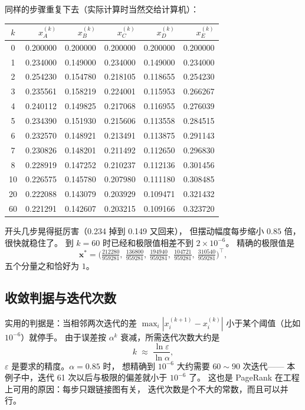\documentclass[UTF8,11pt,fontset=macnew]{ctexart}
\newcommand{\xv}{\mathbf{x}}
\begin{document}
同样的步骤重复下去（实际计算时当然交给计算机）：

\begin{center}
\footnotesize
\setlength{\tabcolsep}{7pt}
\begin{tabular}{c rrrrr}
\toprule
$k$ & $x_A^{(k)}$ & $x_B^{(k)}$ & $x_C^{(k)}$ & $x_D^{(k)}$ & $x_E^{(k)}$\\
\midrule
0  & 0.200000 & 0.200000 & 0.200000 & 0.200000 & 0.200000\\
1  & 0.234000 & 0.149000 & 0.234000 & 0.149000 & 0.234000\\
2  & 0.254230 & 0.154780 & 0.218105 & 0.118655 & 0.254230\\
3  & 0.235561 & 0.158219 & 0.224001 & 0.115953 & 0.266267\\
4  & 0.240112 & 0.149825 & 0.217068 & 0.116955 & 0.276039\\
5  & 0.234390 & 0.151930 & 0.215606 & 0.113558 & 0.284515\\
6  & 0.232570 & 0.148921 & 0.213491 & 0.113875 & 0.291143\\
7  & 0.230826 & 0.148201 & 0.211492 & 0.112650 & 0.296830\\
8  & 0.228919 & 0.147252 & 0.210237 & 0.112136 & 0.301456\\
10 & 0.226575 & 0.145780 & 0.207980 & 0.111180 & 0.308485\\
20 & 0.222088 & 0.143079 & 0.203929 & 0.109471 & 0.321432\\
60 & 0.221291 & 0.142607 & 0.203215 & 0.109166 & 0.323720\\
\bottomrule
\end{tabular}
\end{center}

开头几步晃得挺厉害（0.234 掉到 0.149 又回来），
但摆动幅度每步缩小 $0.85$ 倍，很快就稳住了。
到 $k=60$ 时已经和极限值相差不到 $2\times 10^{-6}$。
精确的极限值是
\[
\xv^*=\Big(\tfrac{212280}{959281},\ \tfrac{136800}{959281},\ \tfrac{194940}{959281},\
\tfrac{104721}{959281},\ \tfrac{310540}{959281}\Big)^{\!\top},
\]
五个分量之和恰好为 $1$。

\subsection{收敛判据与迭代次数}

实用的判据是：当相邻两次迭代的差 $\max_i|x_i^{(k+1)}-x_i^{(k)}|$
小于某个阈值（比如 $10^{-6}$）就停手。
由于误差按 $\alpha^k$ 衰减，所需迭代次数大约是
\[
k \;\approx\; \frac{\ln \varepsilon}{\ln \alpha},
\]
$\varepsilon$ 是要求的精度。$\alpha=0.85$ 时，
想精确到 $10^{-6}$ 大约需要 $60\sim 90$ 次迭代——
本例子中，迭代 61 次以后与极限的偏差就小于 $10^{-6}$ 了。
这也是 PageRank 在工程上可用的原因：每步只跟链接图有关，
迭代次数是个不大的常数，而且可以并行。
\end{document}

